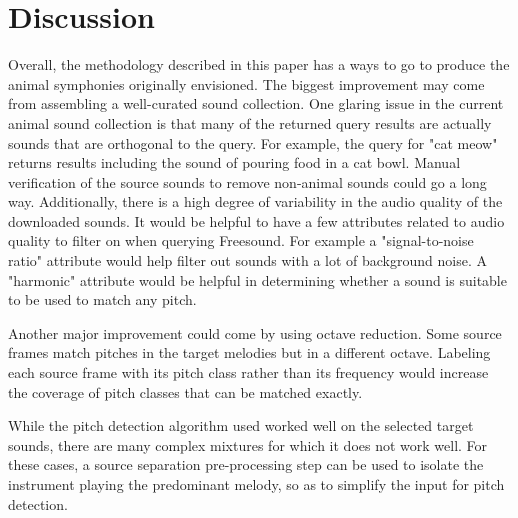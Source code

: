 \documentclass{article}
\begin{document}
\section{Discussion}

Overall, the methodology described in this paper has a ways to go to produce the animal symphonies originally envisioned. The biggest improvement may come from assembling a well-curated sound collection. One glaring issue in the current animal sound collection is that many of the returned query results are actually sounds that are orthogonal to the query. For example, the query for "cat meow" returns results including the sound of pouring food in a cat bowl. Manual verification of the source sounds to remove non-animal sounds could go a long way. Additionally, there is a high degree of variability in the audio quality of the downloaded sounds. It would be helpful to have a few attributes related to audio quality to filter on when querying Freesound. For example a "signal-to-noise ratio" attribute would help filter out sounds with a lot of background noise. A "harmonic" attribute would be helpful in determining whether a sound is suitable to be used to match any pitch.

Another major improvement could come by using octave reduction. Some source frames match pitches in the target melodies but in a different octave. Labeling each source frame with its pitch class rather than its frequency would increase the coverage of pitch classes that can be matched exactly.

While the pitch detection algorithm used worked well on the selected target sounds, there are many complex mixtures for which it does not work well. For these cases, a source separation pre-processing step can be used to isolate the instrument playing the predominant melody, so as to simplify the input for pitch detection.




\end{document}

